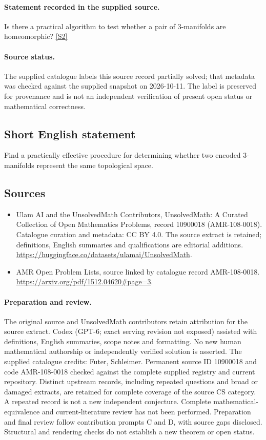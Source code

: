 \documentclass[11pt]{article}
\begin{document}
\paragraph{Statement recorded in the supplied source.}
Is there a practical algorithm to test whether a pair of $3$-manifolds are homeomorphic? \href{https://arxiv.org/pdf/1512.04620#page=3}{[S2]}
\paragraph{Source status.}
The supplied catalogue labels this source record partially solved; that metadata was checked against the supplied snapshot on 2026-10-11. The label is preserved for provenance and is not an independent verification of present open status or mathematical correctness.
\subsection{Short English statement}
Find a practically effective procedure for determining whether two encoded 3-manifolds represent the same topological space.
\subsection{Sources}
\begin{itemize}
\item[S1] Ulam AI and the UnsolvedMath Contributors, UnsolvedMath: A Curated Collection of Open Mathematics Problems, record 10900018 (AMR-108-0018). Catalogue curation and metadata: CC BY 4.0. The source extract is retained; definitions, English summaries and qualifications are editorial additions.
\url{https://huggingface.co/datasets/ulamai/UnsolvedMath}.
\item[S2] AMR Open Problem Lists, source linked by catalogue record AMR-108-0018.
\url{https://arxiv.org/pdf/1512.04620#page=3}.
\end{itemize}
\paragraph{Preparation and review.}
The original source and UnsolvedMath contributors retain attribution for the source extract. Codex (GPT-6; exact serving revision not exposed) assisted with definitions, English summaries, scope notes and formatting. No new human mathematical authorship or independently verified solution is asserted. The supplied catalogue credits: Futer, Schleimer. Permanent source ID 10900018 and code AMR-108-0018 checked against the complete supplied registry and current repository. Distinct upstream records, including repeated questions and broad or damaged extracts, are retained for complete coverage of the source CS category. A repeated record is not a new independent conjecture. Complete mathematical-equivalence and current-literature review has not been performed. Preparation and final review follow contribution prompts C and D, with source gaps disclosed. Structural and rendering checks do not establish a new theorem or open status.
\label{end:10900018}
\end{document}
